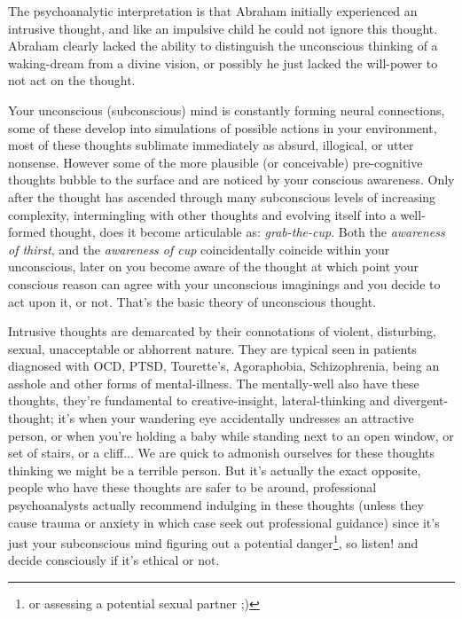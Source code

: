 The psychoanalytic interpretation is that Abraham initially experienced an intrusive thought, and like an impulsive child he could not ignore this thought. Abraham clearly lacked the ability to distinguish the unconscious thinking of a waking-dream from a divine vision, or possibly he just lacked the will-power to not act on the thought. %

Your unconscious (subconscious) mind is constantly forming neural connections, some of these develop into simulations of possible actions in your environment, most of these thoughts sublimate immediately as absurd, illogical, or utter nonsense. However some of the more plausible (or conceivable) pre-cognitive thoughts bubble to the surface and are noticed by your conscious awareness. Only after the thought has ascended through many subconscious levels of increasing complexity, intermingling with other thoughts and evolving itself into a well-formed thought, does it become articulable as: \textit{grab-the-cup}. Both the \textit{awareness of thirst}, and the \textit{awareness of cup} coincidentally coincide within your unconscious, later on you become aware of the thought at which point your conscious reason can agree with your unconscious imaginings and you decide to act upon it, or not. That's the basic theory of unconscious thought. 

Intrusive thoughts are demarcated by their connotations of violent, disturbing, sexual, unacceptable or abhorrent nature. They are typical seen in patients diagnosed with OCD, PTSD, Tourette's, Agoraphobia, Schizophrenia, being an asshole and other forms of mental-illness. The mentally-well also have these thoughts, they're fundamental to creative-insight, lateral-thinking and divergent-thought; it's when your wandering eye accidentally undresses an attractive person, or when you're holding a baby while standing next to an open window, or set of stairs, or a cliff... We are quick to admonish ourselves for these thoughts thinking we might be a terrible person. But it's actually the exact opposite, people who have these thoughts are safer to be around, professional psychoanalysts actually recommend indulging in these thoughts (unless they cause trauma or anxiety in which case seek out professional guidance) since it's just your subconscious mind figuring out a potential danger\footnote{or assessing a potential sexual partner ;)}, so listen! and decide consciously if it's ethical or not.

